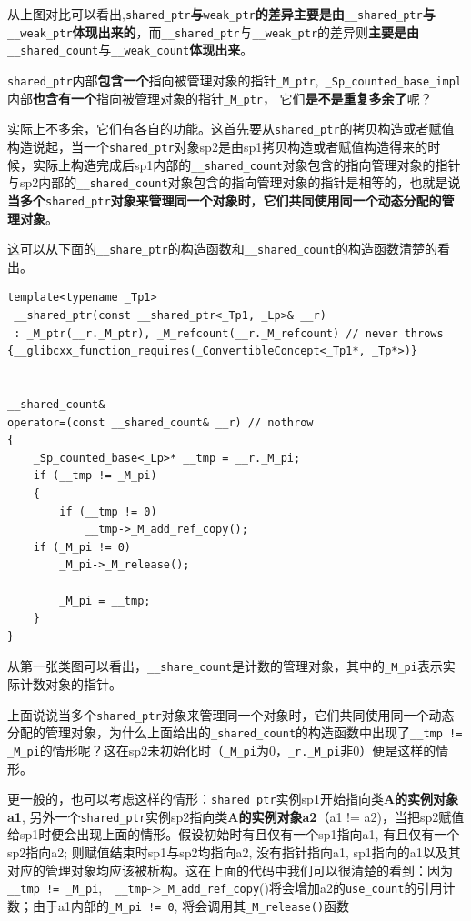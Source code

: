 \documentclass[UTF8,a4paper,12pt]{ctexbook}
\begin{document}
	从上图对比可以看出,\verb|shared_ptr|\textbf{与}\verb|weak_ptr|\textbf{的差异主要是由}\verb|__shared_ptr|\textbf{与}\verb|__weak_ptr|\textbf{体现出来的}，而\verb|__shared_ptr|与\verb|__weak_ptr|的差异则\textbf{主要是由}\verb|__shared_count|与\verb|__weak_count|\textbf{体现出来}。
	
	\verb|shared_ptr|内部\textbf{包含一个}指向被管理对象的指针\verb|_M_ptr|,\verb| _Sp_counted_base_impl|内部\textbf{也含有一个}指向被管理对象的指针\verb|_M_ptr|， 它们\textbf{是不是重复多余了}呢？
	
	实际上不多余，它们有各自的功能。这首先要从\verb|shared_ptr|的拷贝构造或者赋值构造说起，当一个\verb|shared_ptr|对象sp2是由sp1拷贝构造或者赋值构造得来的时候，实际上构造完成后sp1内部的\verb|__shared_count|对象包含的指向管理对象的指针与sp2内部的\verb|__shared_count|对象包含的指向管理对象的指针是相等的，也就是说\textbf{当多个}\verb|shared_ptr|\textbf{对象来管理同一个对象时}，\textbf{它们共同使用同一个动态分配的管理对象}。
	
	这可以从下面的\verb|__share_ptr|的构造函数和\verb|__shared_count|的构造函数清楚的看出。
	
	\begin{lstlisting}
template<typename _Tp1>
 __shared_ptr(const __shared_ptr<_Tp1, _Lp>& __r)
 : _M_ptr(__r._M_ptr), _M_refcount(__r._M_refcount) // never throws
{__glibcxx_function_requires(_ConvertibleConcept<_Tp1*, _Tp*>)}
 
 
__shared_count&
operator=(const __shared_count& __r) // nothrow
{
    _Sp_counted_base<_Lp>* __tmp = __r._M_pi;
    if (__tmp != _M_pi)
    {
        if (__tmp != 0)
            __tmp->_M_add_ref_copy();
	if (_M_pi != 0)
	    _M_pi->_M_release();
	
        _M_pi = __tmp;
    }
}	
	\end{lstlisting}
	
	从第一张类图可以看出，\verb|__share_count|是计数的管理对象，其中的\verb|_M_pi|表示实际计数对象的指针。
	
	
	上面说说当多个\verb|shared_ptr|对象来管理同一个对象时，它们共同使用同一个动态分配的管理对象，为什么上面给出的\verb|_shared_count|的构造函数中出现了\verb|__tmp != _M_pi|的情形呢？这在sp2未初始化时（\verb|_M_pi|为0，\verb|_r._M_pi|非0）便是这样的情形。
	
	更一般的，也可以考虑这样的情形：\verb|shared_ptr|实例sp1开始指向类\textbf{A的实例对象a1}, 另外一个\verb|shared_ptr|实例sp2指向类\textbf{A的实例对象a2}（a1 != a2)，当把sp2赋值给sp1时便会出现上面的情形。假设初始时有且仅有一个sp1指向a1, 有且仅有一个sp2指向a2; 则赋值结束时sp1与sp2均指向a2, 没有指针指向a1, sp1指向的a1以及其对应的管理对象均应该被析构。这在上面的代码中我们可以很清楚的看到：因为\verb|__tmp != _M_pi|, \verb| __tmp|->\verb|_M_add_ref_copy|()将会增加a2的\verb|use_count|的引用计数；由于a1内部的\verb|_M_pi != 0|, 将会调用其\verb|_M_release()|函数
	
\end{document}
